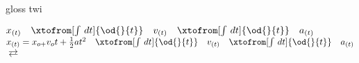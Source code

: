 \gls{gloss}
\ac{twi}

{\Huge $  x_{(t)} \quad \xtofrom[\int \,dt]{\od{}{t}} \quad v_{(t)} \quad \xtofrom[\int \,dt]{\od{}{t}} \quad a_{(t)} $}
\newline
{\huge $  x_{(t)}=x_{o+}v_{o}t+\frac{1}{2}at^2 \quad \xtofrom[\int \,dt]{\od{}{t}} \quad v_{(t)} \quad \xtofrom[\int \,dt]{\od{}{t}} \quad a_{(t)} $}
$ \rightleftarrows $